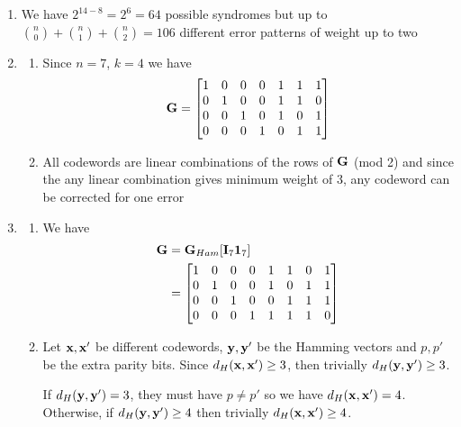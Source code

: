 \documentclass[12pt, a4paper]{article}
\begin{document}
\begin{enumerate}
  \item We have $2^{14-8} = 2^6 = 64$ possible syndromes but up to $\binom n0 + \binom n1 + \binom n2 = 106$ different error patterns of weight up to two

  \item 
    \begin{enumerate}
      \item Since $n=7$, $k=4$ we have 
        \begin{align*}
          \mathbf{G} = \begin{bmatrix}
            1 & 0 & 0 & 0 & 1 & 1 & 1\\
            0 & 1 & 0 & 0 & 1 & 1 & 0\\
            0 & 0 & 1 & 0 & 1 & 0 & 1\\
            0 & 0 & 0 & 1 & 0 & 1 & 1\\
          \end{bmatrix}
        \end{align*}

      \item All codewords are linear combinations of the rows of $\mathbf{G}$ (mod 2) and since the any linear combination gives minimum weight of 3, any codeword can be corrected for one error
    \end{enumerate}

  \item 
    \begin{enumerate}
      \item We have 
        \begin{align}
          \mathbf{G} &= \mathbf{G}_{Ham}[\mathbf{I}_7 \mathbf{1}_7]\\ 
              &= \begin{bmatrix}
                1 & 0 & 0 & 0 & 1 & 1 & 0 & 1\\
                0 & 1 & 0 & 0 & 1 & 0 & 1 & 1\\
                0 & 0 & 1 & 0 & 0 & 1 & 1 & 1\\
                0 & 0 & 0 & 1 & 1 & 1 & 1 & 0\\
              \end{bmatrix}
        \end{align}

      \item Let $\mathbf{x}, \mathbf{x}'$ be different codewords, $\mathbf{y}, \mathbf{y}'$ be the Hamming vectors and $p, p'$ be the extra parity bits. Since $d_H(\mathbf{x}, \mathbf{x}') \geq 3$, then trivially $d_H(\mathbf{y}, \mathbf{y}') \geq 3$.

        If $d_H(\mathbf{y}, \mathbf{y}') = 3$, they must have $p \neq p'$ so we have $d_H(\mathbf{x}, \mathbf{x}') = 4$. Otherwise, if $d_H(\mathbf{y}, \mathbf{y}') \geq 4$ then trivially $d_H(\mathbf{x}, \mathbf{x}') \geq 4$.
    \end{enumerate}


\end{enumerate}
\end{document}
